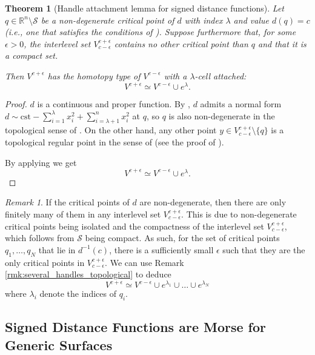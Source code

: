 \documentclass[11pt]{article}
\newcommand{\R}{\mathbb{R}}
\newcommand{\eps}{\epsilon}
\newcommand{\union}{\cup}
\newcommand{\Surf}{\mathcal{S}}
\newcommand{\level}[2]{{#1}^{-1}\left({#2}\right)}
\theoremstyle{plain}
\newtheorem{thm}{Theorem}
\theoremstyle{definition}
\theoremstyle{remark}
\newtheorem{rmk}{Remark}
\begin{document}
	\begin{thm}[Handle attachment lemma for signed distance functions]
		\label{thm:dist_handle_lemma}
		Let $q \in \R^n \setminus \Surf$ be a non-degenerate critical point of $d$ with index $\lambda$ and value $d(q) = c$ (i.e., one that satisfies the conditions of ). Suppose furthermore that, for some $\eps > 0$, the interlevel set $V_{c - \eps}^{c + \eps}$ contains no other critical point than $q$ and that it is a compact set. 
		
		Then $V^{c + \eps}$ has the homotopy type of $V^{c-\eps}$ with a $\lambda$-cell attached: 
		\[V^{c + \eps} \simeq V^{c-\eps} \union e^\lambda.\]
	\end{thm}
	\begin{proof}
		$d$ is a continuous and proper function. By , $d$ admits a normal form $d \sim \mathrm{cst} - \sum_{i = 1}^{\lambda} x_i^2 + \sum_{i = \lambda + 1}^{n} x_i^2 $ at $q$, so $q$ is also non-degenerate in the topological sense of .
		On the other hand, any other point $y \in V_{c - \eps}^{c + \eps} \setminus \{q\}$ is a topological regular point in the sense of  (see the proof of ).
		
		By applying  we get
		\[V^{c+\eps} \simeq V^{c-\eps} \union e^\lambda.\]
	\end{proof}
	
	\begin{rmk}
		If the critical points of $d$ are non-degenerate, then there are only finitely many of them in any interlevel set $V_{c - \eps}^{c + \eps}$. This is due to non-degenerate critical points being isolated and the compactness of the interlevel set $V_{c - \eps}^{c + \eps}$, which follows from $\Surf$ being compact. As such, for the set of critical points $q_1, \ldots, q_N$ that lie in $\level{d}{c}$, there is a sufficiently small $\epsilon$ such that they are the only critical points in  $V_{c - \eps}^{c + \eps}$. We can use Remark \ref{rmk:several_handles_topological} to deduce
		\[V^{c+\eps} \simeq V^{c-\eps} \union e^{\lambda_1} \union \ldots \union e^{\lambda_N}\]
		where $\lambda_i$ denote the indices of $q_i$.
	\end{rmk}
	
	
	\subsection{Signed Distance Functions are Morse for Generic Surfaces}
	\label{sec:genericity}
	
\end{document}
